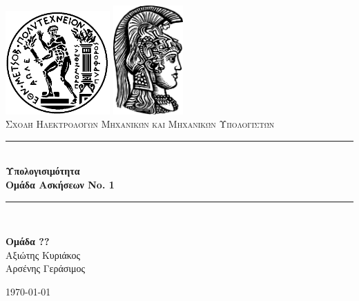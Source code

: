 \newcommand{\HRule}{\rule{\linewidth}{0.5mm}}

\begin{titlepage}
\begin{center}

\includegraphics[width=0.3\textwidth]{../logos/pyrforos.png}
\includegraphics[width=0.2\textwidth]{../logos/uoa.png}\\[1cm]

\textsc{\LARGE Σχολή Ηλεκτρολόγων Μηχανικών και Μηχανικών Υπολογιστών}\\[1.5cm]

\HRule \\[0.4cm]
{\huge \bfseries Υπολογισιμότητα\\
\LARGE Ομάδα Ασκήσεων No. 1}\\[0.4cm]

\HRule \\[1.5cm]

\begin{center}
\textbf{Ομάδα ??}\\
Αξιώτης Κυριάκος\\
Αρσένης Γεράσιμος
\end{center}

\vfill

{\large \today}
\end{center}

\end{titlepage}

